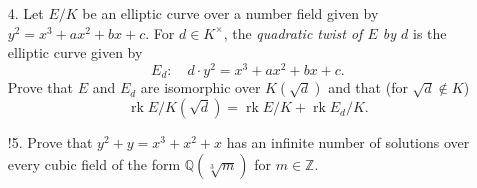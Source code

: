\documentclass[a4paper]{article}
\theoremstyle{plain}
\theoremstyle{remark}
\theoremstyle{definition}
\DeclareMathOperator{\Hom}{Hom}
\DeclareMathOperator{\rk}{rk}
\newcommand{\Z}{\mathbb{Z}}
\newcommand{\Q}{\mathbb{Q}}
\begin{document}
\begin{enumerate}
\begin{proof}[Solution]
            Now by the Mordell--Weil Theorem we have $E(K)\cong\Delta\times\Z^r$
            for some finite group $\Delta$, where $r$ is the rank. Then
            \begin{equation*}
                E(K)/2E(K) \cong E(K)[2]\times C_2^r \cong C_2^{r+2},
            \end{equation*}
            and from above this is a subgroup of
            \begin{equation*}
                \Hom(G,E(K)[2]) = \Hom(C_2^n,C_2\times C_2) = C_2^{2n}.
            \end{equation*}
            Hence $r+2\le2n$, i.e. $r\le2n-2$.
        \end{proof}

    \item[4.] Let $E/K$ be an elliptic curve over a number field given by
        $y^2=x^3+ax^2+bx+c$. For $d\in K^\times$, the \emph{quadratic twist of
        $E$ by $d$} is the elliptic curve given by
        \begin{equation*}
            E_d:\quad d\cdot y^2=x^3+ax^2+bx+c.
        \end{equation*}
        Prove that $E$ and $E_d$ are isomorphic over $K(\sqrt d)$ and that (for
        $\sqrt d\notin K$)
        \begin{equation*}
            \rk E/K(\sqrt d) = \rk E/K + \rk E_d/K.
        \end{equation*}

    \item[!5.] Prove that $y^2+y=x^3+x^2+x$ has an infinite number of solutions
        over every cubic field of the form $\Q(\sqrt[3]{m})$ for $m\in\Z$.
\end{enumerate}
\end{document}
